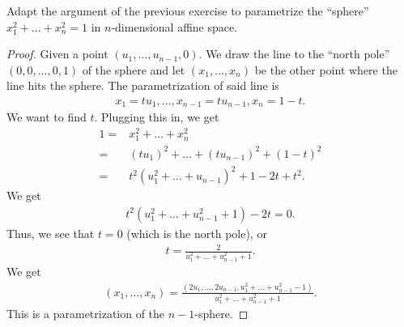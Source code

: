 \begin{exercise}{7}
    Adapt the argument of the previous exercise to parametrize the ``sphere'' $x_1^2 + \dots + x_n^2 = 1$ in $n$-dimensional affine space.
\end{exercise}
\begin{proof}
    Given a point $(u_1,\dots,u_{n-1},0)$. 
    We draw the line to the ``north pole'' $(0,0,\dots,0,1)$ of the sphere and let $(x_1,\dots,x_n)$ be the other point where the line hits the sphere. The parametrization of said line is
    \begin{align*}
        x_1 = tu_1, \dots, x_{n-1} = tu_{n-1}, x_n = 1 - t.
    \end{align*}
    We want to find $t$. Plugging this in, we get
    \begin{align*}
        1
        =& x_1^2 + \dots + x_n^2\\
        =& (tu_1)^2 + \dots + (tu_{n-1})^2 + (1-t)^2\\
        =& t^2 (u_1^2 + \dots + u_{n-1})^2 + 1 - 2t + t^2.
    \end{align*}
    We get
    \begin{align*}
        t^2 (u_1^2 + \dots + u_{n-1}^2 + 1) - 2t = 0.
    \end{align*}
    Thus, we see that $t=0$ (which is the north pole), or
    \begin{align*}
        t = \frac{2}{u_1^2 + \dots + u_{n-1}^2 + 1}.
    \end{align*}
    We get
    \begin{align*}
        (x_1,\dots,x_n) 
        = \frac{(2u_1, \dots, 2 u_{n-1}, u_1^2 + \dots + u_{n-1}^2 -1)}{u_1^2 + \dots + u_{n-1}^2 + 1}.
    \end{align*}
    This is a parametrization of the $n-1$-sphere.
\end{proof}

